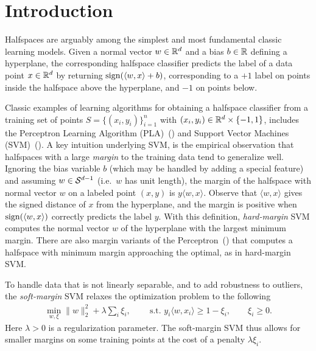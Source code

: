 \section{Introduction}
Halfspaces are arguably among the simplest and most fundamental classic learning models. Given a normal vector $w \in \mathbb{R}^d$ and a bias $b \in \mathbb{R}$ defining a hyperplane, the corresponding halfspace classifier predicts the label of a data point $x \in \mathbb{R}^d$ by returning $\operatorname{sign}(\langle w, x \rangle+b)$, corresponding to a $+1$ label on points inside the halfspace above the hyperplane, and $-1$ on points below.

Classic examples of learning algorithms for obtaining a halfspace classifier from a training set of points $S = \{(x_i,y_i)\}_{i=1}^n$ with $(x_i, y_i) \in \mathbb{R}^d \times \{-1,1\}$, includes the Perceptron Learning Algorithm (PLA)~(\cite{perceptron}) and Support Vector Machines (SVM)~(\cite{Cortes1995}). A key intuition underlying SVM, is the empirical observation that halfspaces with a large \emph{margin} to the training data tend to generalize well. Ignoring the bias variable $b$ (which may be handled by adding a special feature) and assuming $w \in \mathcal{S}^{d-1}$ (i.e.\ $w$ has unit length), the margin of the halfspace with normal vector $w$ on a labeled point $(x,y)$ is $y \langle w, x \rangle$. Observe that $\langle w, x\rangle$ gives the signed distance of $x$ from the hyperplane, and the margin is positive when $\operatorname{sign}(\langle w, x \rangle)$ correctly predicts the label $y$. With this definition, \emph{hard-margin} SVM 
computes the normal vector $w$ of the hyperplane with the largest minimum margin.
There are also margin variants of the Perceptron~(\cite{marginperceptron}) that computes a halfspace with minimum margin approaching the optimal, as in hard-margin SVM.

To handle data that is not linearly separable, and to add robustness to outliers, the \emph{soft-margin} SVM relaxes the optimization problem to the following
\begin{align*}
    \min_{w, \xi} \|w\|_2^2 + \lambda \sum_i \xi_i,\ \qquad
    \textrm{s.t. } y_i \langle w, x_i \rangle \geq 1- \xi_i,\qquad
    \xi_i \geq 0.
\end{align*}
Here $\lambda>0$ is a regularization parameter. The soft-margin SVM thus allows for smaller margins on some training points at the cost of a penalty $\lambda \xi_i$.

